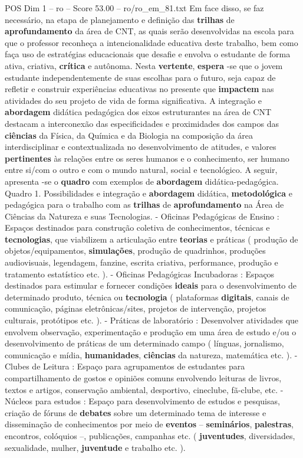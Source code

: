 \begin{textsample}{POS Dim 1 – ro – Score 53.00 – ro/ro\_em\_81.txt}
Em face disso, se faz necessário, na etapa de planejamento e definição das \textbf{trilhas} de \textbf{aprofundamento} da área de CNT, as quais serão desenvolvidas na escola para que o professor reconheça a intencionalidade educativa deste trabalho, bem como faça uso de estratégias educacionais que desafie e envolva o estudante de forma ativa, criativa, \textbf{crítica} e autônoma.
Nesta \textbf{vertente}, \textbf{espera} -se que o jovem estudante independentemente de suas escolhas para o futuro, seja capaz de refletir e construir experiências educativas no presente que \textbf{impactem} nas atividades do seu projeto de vida de forma significativa.
A integração e \textbf{abordagem} didática pedagógica dos eixos estruturantes na área de CNT destacam a interconexão das especificidades e proximidades dos campos das \textbf{ciências} da Física, da Química e da Biologia na composição da área interdisciplinar e contextualizada no desenvolvimento de atitudes, e valores \textbf{pertinentes} às relações entre os seres humanos e o conhecimento, ser humano entre si/com o outro e com o mundo natural, social e tecnológico.
A seguir, apresenta -se o \textbf{quadro} com exemplos de \textbf{abordagem} didática-pedagógica.
Quadro 1.
Possibilidades e integração e \textbf{abordagem} didática, \textbf{metodológica} e pedagógica para o trabalho com as \textbf{trilhas} de \textbf{aprofundamento} na Área de Ciências da Natureza e suas Tecnologias. - Oficinas Pedagógicas de Ensino : Espaços destinados para construção coletiva de conhecimentos, técnicas e \textbf{tecnologias}, que viabilizem a articulação entre \textbf{teorias} e práticas ( produção de objetos/equipamentos, \textbf{simulações}, produção de quadrinhos, produções audiovisuais, legendagem, fanzine, escrita criativa, performance, produção e tratamento estatístico etc. ). - Oficinas Pedagógicas Incubadoras : Espaços destinados para estimular e fornecer condições \textbf{ideais} para o desenvolvimento de determinado produto, técnica ou \textbf{tecnologia} ( plataformas \textbf{digitais}, canais de comunicação, páginas eletrônicas/sites, projetos de intervenção, projetos culturais, protótipos etc. ). - Práticas de laboratório : Desenvolver atividades que envolvem observação, experimentação e produção em uma área de estudo e/ou o desenvolvimento de práticas de um determinado campo ( línguas, jornalismo, comunicação e mídia, \textbf{humanidades}, \textbf{ciências} da natureza, matemática etc. ). - Clubes de Leitura : Espaço para agrupamentos de estudantes para compartilhamento de gostos e opiniões comuns envolvendo leituras de livros, textos e artigos, conservação ambiental, desportivo, cineclube, fã-clube, etc. - Núcleos para estudos : Espaço para desenvolvimento de estudos e pesquisas, criação de fóruns de \textbf{debates} sobre um determinado tema de interesse e disseminação de conhecimentos por meio de \textbf{eventos} – \textbf{seminários}, \textbf{palestras}, encontros, colóquios –, publicações, campanhas etc. ( \textbf{juventudes}, diversidades, sexualidade, mulher, \textbf{juventude} e trabalho etc. ).

\end{textsample}
